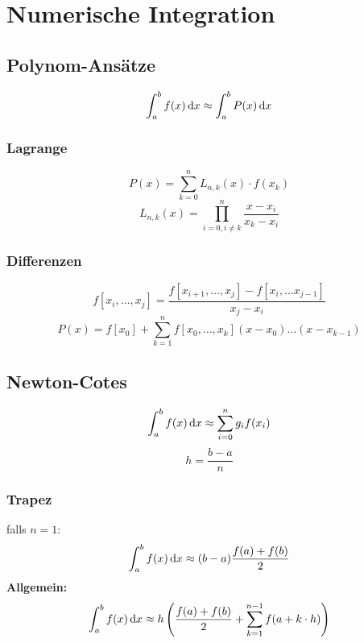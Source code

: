 \documentclass[german]{latex4ei/latex4ei_fs}
\begin{document}
\section{Numerische Integration}
\begin{sectionbox}
\subsection{Polynom-Ansätze}
\begin{equation*}
	\int_a^b f(x) \diff x \approx \int_a^b P(x) \diff x
\end{equation*}

\subsubsection{Lagrange}
\begin{equation*}
	P(x) = \sum_{k = 0}^n L_{n, k}(x)\cdot f(x_k)
\end{equation*}
\begin{equation*}
	L_{n, k}(x) = \prod_{i = 0, i \ne k}^n \frac{x - x_i}{x_k - x_i}
\end{equation*}

\subsubsection{Differenzen}
\begin{equation*}
	f[x_i, \dots, x_j] = \frac{f[x_{i + 1}, \dots, x_j] - f[x_i, \dots x_{j - 1}]}{x_j - x_i}
\end{equation*}
\begin{equation*}
	P(x) = f[x_0] + \sum_{k = 1}^n f[x_0, \dots, x_k] (x - x_0) \dots (x - x_{k - 1})
\end{equation*}
\end{sectionbox}

\begin{sectionbox}
\subsection{Newton-Cotes}
\begin{equation*}
	\int_a^b f(x) \diff x \approx \sum_{i = 0}^n g_i f(x_i)
\end{equation*}
\begin{equation*}
	h = \frac{b - a}{n}
\end{equation*}

\subsubsection{Trapez}
falls $n = 1$:
\begin{equation*}
	\int_a^b f(x) \diff x \approx (b - a) \frac{f(a) + f(b)}{2}
\end{equation*}
\textbf{Allgemein:}
\begin{equation*}
	\int_a^b f(x) \diff x \approx h \left( \frac{f(a) + f(b)}{2} + \sum_{k = 1}^{n - 1} f(a + k \cdot h) \right)
\end{equation*}
\end{sectionbox}
\end{document}
